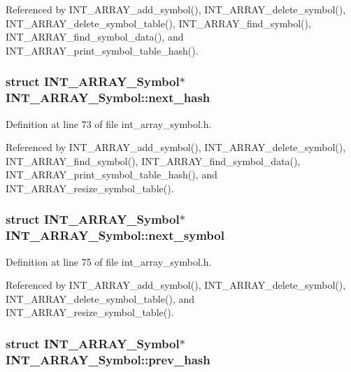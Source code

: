 Referenced by INT\_\-ARRAY\_\-add\_\-symbol(), INT\_\-ARRAY\_\-delete\_\-symbol(), INT\_\-ARRAY\_\-delete\_\-symbol\_\-table(), INT\_\-ARRAY\_\-find\_\-symbol(), INT\_\-ARRAY\_\-find\_\-symbol\_\-data(), and INT\_\-ARRAY\_\-print\_\-symbol\_\-table\_\-hash().
\subsubsection{\setlength{\rightskip}{0pt plus 5cm}struct \bf{INT\_\-ARRAY\_\-Symbol}$\ast$ \bf{INT\_\-ARRAY\_\-Symbol::next\_\-hash}}\label{structINT__ARRAY__Symbol_8bf2c0607f99d02c3bf297a86b5276f3}




Definition at line 73 of file int\_\-array\_\-symbol.h.

Referenced by INT\_\-ARRAY\_\-add\_\-symbol(), INT\_\-ARRAY\_\-delete\_\-symbol(), INT\_\-ARRAY\_\-find\_\-symbol(), INT\_\-ARRAY\_\-find\_\-symbol\_\-data(), INT\_\-ARRAY\_\-print\_\-symbol\_\-table\_\-hash(), and INT\_\-ARRAY\_\-resize\_\-symbol\_\-table().
\subsubsection{\setlength{\rightskip}{0pt plus 5cm}struct \bf{INT\_\-ARRAY\_\-Symbol}$\ast$ \bf{INT\_\-ARRAY\_\-Symbol::next\_\-symbol}}\label{structINT__ARRAY__Symbol_12f3a6907753a92042abf1a37d55fb64}




Definition at line 75 of file int\_\-array\_\-symbol.h.

Referenced by INT\_\-ARRAY\_\-add\_\-symbol(), INT\_\-ARRAY\_\-delete\_\-symbol(), INT\_\-ARRAY\_\-delete\_\-symbol\_\-table(), and INT\_\-ARRAY\_\-resize\_\-symbol\_\-table().
\subsubsection{\setlength{\rightskip}{0pt plus 5cm}struct \bf{INT\_\-ARRAY\_\-Symbol}$\ast$ \bf{INT\_\-ARRAY\_\-Symbol::prev\_\-hash}}\label{structINT__ARRAY__Symbol_366bce1ab935f754e157683ca4e30674}




